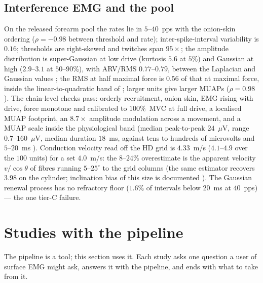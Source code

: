 \documentclass[11pt,a4paper]{article}
\begin{document}
\subsection{Interference EMG and the pool}
\label{sec:val-emg}
On the released forearm pool the rates lie in $5$--$40$~pps with the onion-skin ordering
($\rho = -0.98$ between threshold and rate); inter-spike-interval variability is $0.16$;
thresholds are right-skewed and twitches span $95\times$; the amplitude distribution is
super-Gaussian at low drive (kurtosis $5.6$ at $5\%$) and Gaussian at high ($2.9$--$3.1$
at $50$--$90\%$), with ARV/RMS $0.77$--$0.79$, between the Laplacian and Gaussian values
\citep{clancy1999probability, nazarpour2013note}; the RMS at half maximal force is $0.56$
of that at maximal force, inside the linear-to-quadratic band of
\citet{lawrence1983myoelectric}; larger units give larger MUAPs ($\rho = 0.98$). The
chain-level checks pass: orderly recruitment, onion skin, EMG rising with drive, force
monotone and calibrated to $100\%$~MVC at full drive, a localised MUAP footprint, an
$8.7\times$ amplitude modulation across a movement, and a MUAP scale inside the
physiological band (median peak-to-peak $24$~$\mu$V, range $0.7$--$160$~$\mu$V, median
duration $18$~ms, against tens to hundreds of microvolts and $5$--$20$~ms
\citep{merletti2019tutorial}). Conduction velocity read off the HD grid is $4.33$~m/s
($4.1$--$4.9$ over the $100$ units) for a set $4.0$~m/s: the $8$--$24\%$ overestimate is
the apparent velocity $v/\cos\theta$ of fibres running $5$--$25^\circ$ to the grid columns
(the same estimator recovers $3.98$ on the cylinder; inclination bias of this size is
documented \citep{mesin2007estimation}). The Gaussian renewal process has no refractory
floor ($1.6\%$ of intervals below $20$~ms at $40$~pps) --- the one tier-C failure.

\section{Studies with the pipeline}
\label{sec:studies}

The pipeline is a tool; this section uses it. Each study asks one question a user of
surface EMG might ask, answers it with the pipeline, and ends with what to take from it.
\end{document}
